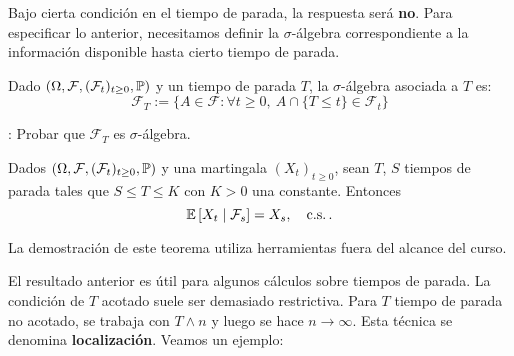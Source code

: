 \newp Bajo cierta condición en el tiempo de parada, la respuesta será \textbf{no}. Para especificar lo anterior, 
necesitamos definir la $\sigma$-álgebra correspondiente a la información disponible hasta cierto 
tiempo de parada. 
\begin{definition}
Dado $(\Omega, \mathcal{F}, (\mathcal{F}_t)_{t \geq 0}, \P)$ y un tiempo de parada $T$, la 
$\sigma$-álgebra asociada a $T$ es:
\begin{equation*}
        \mathcal{F}_T := \{ A \in \mathcal{F}: \forall t \geq 0, ~ A \cap
        \{T\leq t\} \in \mathcal{F}_t \}
\end{equation*}
\end{definition}
\ejercicio  \gris : Probar que $\mathcal{F}_T$ es $\sigma$-álgebra. \negro

\begin{theorem}
Dados $(\Omega, \mathcal{F}, (\mathcal{F}_t)_{t \geq 0}, \P)$ y una martingala $(X_t)_{t \geq 0}$, 
sean $T$, $S$ tiempos de parada tales que $S \leq T \le K$ con $K>0$ una constante. Entonces 
\begin{equation*}
        \E \left[ X_t \mid  \mathcal{F}_s \right]  = X_s,  ~ ~ ~ \text{c.s.}\,.
\end{equation*}
\end{theorem}
La demostración de este teorema utiliza herramientas fuera del alcance del curso. 

\newp El resultado anterior es útil para algunos cálculos sobre tiempos de parada. La condición de $T$ acotado suele ser demasiado restrictiva. Para $T$ tiempo de parada no acotado, se trabaja con $T \wedge n$ y luego se hace $n \to \infty$. Esta técnica se denomina \textbf{localización}. Veamos un ejemplo:


